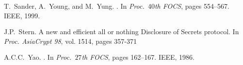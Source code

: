 \documentclass{article}
\begin{document}
\begin{footnotesize}
\begin{thebibliography}{10}
		T.~Sander, A.~Young, and M.~Yung.
		.
		\newblock In {\em Proc.\ $40$th FOCS}, pages 554--567. IEEE, 1999.
		
		J.P.~Stern.
		\newblock A new and efficient all or nothing Disclosure of Secrets protocol.
		\newblock In {\em Proc. AsiaCrypt 98}, vol. 1514, pages 357-371
		
		A.C.C.~Yao.
		.
		\newblock In {\em Proc.\ $27$th FOCS}, pages 162--167. IEEE, 1986.
		
		
	\end{thebibliography}
	
\end{footnotesize}  
  
   
 
\end{document}
